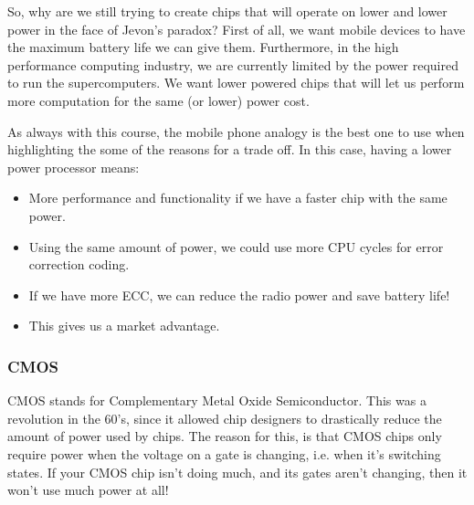 So, why are we still trying to create chips that will operate on lower and lower
power in the face of Jevon's paradox? First of all, we want mobile devices to
have the maximum battery life we can give them. Furthermore, in the high
performance computing industry, we are currently limited by the power required
to run the supercomputers. We want lower powered chips that will let us perform
more computation for the same (or lower) power cost.

As always with this course, the mobile phone analogy is the best one to use when
highlighting the some of the reasons for a trade off. In this case, having a
lower power processor means:

\begin{mymulticols}
  \begin{itemize}
    \item More performance and functionality if we have a faster chip with the 
      same power.
    \item Using the same amount of power, we could use more CPU cycles for 
      error correction coding.
    \item If we have more ECC, we can reduce the radio power and save battery
      life!
    \item This gives us a market advantage.
  \end{itemize}
\end{mymulticols}

\subsubsection{CMOS}


CMOS stands for Complementary Metal Oxide Semiconductor. This was a revolution
in the 60's, since it allowed chip designers to drastically reduce the amount of
power used by chips. The reason for this, is that CMOS chips only require power
when the voltage on a gate is changing, i.e. when it's switching states. If your
CMOS chip isn't doing much, and its gates aren't changing, then it won't use
much power at all!

